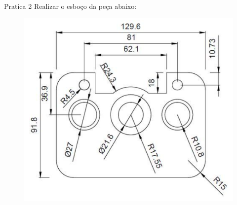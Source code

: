 \documentclass{cubeamer}
\begin{document}
\begin{frame}{Pratica 2}
    Realizar o esboço da peça abaixo:
    \newline
    \begin{center}
        \begin{figure}
            \centering
            \includegraphics[height = 0.5\textheight]{img/pratica2.png}
            \caption{\cite{LearnAut96:online}}
        \end{figure}
    \end{center}
    
\end{frame}
\end{document}
